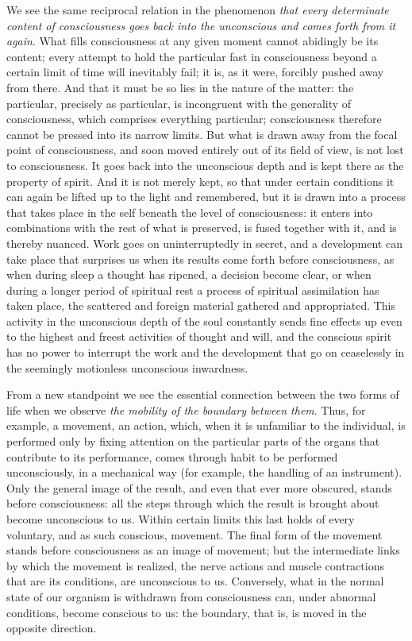 \documentclass[12pt,a4paper,openany]{book}
\newcommand{\opage}[1]{\marginnote{\footnotesize\textit{[#1]}}}
\begin{document}
\opage{48}We see the same reciprocal relation in the phenomenon
\emph{that every determinate content of consciousness goes back into
the unconscious and comes forth from it again}. What fills
consciousness at any given moment cannot abidingly be its content;
every attempt to hold the particular fast in consciousness beyond a
certain limit of time will inevitably fail; it is, as it were, forcibly
pushed away from there. And that it must be so lies in the nature of
the matter: the particular, precisely as particular, is incongruent
with the generality of consciousness, which comprises everything
particular; consciousness therefore cannot be pressed into its narrow
limits. But what is drawn away from the focal point of consciousness,
and soon moved entirely out of its field of view, is not lost to
consciousness. It goes back into the unconscious depth and is kept
there as the property of spirit. And it is not merely kept, so that
under certain conditions it can again be lifted up to the light and
remembered, but it is drawn into a process that takes place in the self
beneath the level of consciousness: it enters into combinations with the
rest of what is preserved, is fused together with it, and is thereby
nuanced. Work goes on uninterruptedly in secret, and a development can
take place that surprises us when its results come forth before
consciousness, as when during sleep a thought has ripened, a decision
become clear, or when during a longer period of spiritual rest a
process of spiritual assimilation has taken place, the scattered and
foreign material gathered and appropriated. This activity in the
unconscious depth of the soul constantly sends fine effects up even
to the highest and freest activities of thought and will, and the
conscious spirit has no power to interrupt the work and the development
that go on ceaselessly in the seemingly motionless unconscious inwardness.

From a new standpoint we see the essential connection between the two
forms of life when we observe \emph{the mobility of the boundary between
them}. Thus, for example, a movement, an action, which, when it is
unfamiliar to
\opage{49}the individual, is performed only by fixing attention on the
particular parts of the organs that contribute to its performance, comes
through habit to be performed unconsciously, in a mechanical way (for
example, the handling of an instrument). Only the general image of the
result, and even that ever more obscured, stands before consciousness:
all the steps through which the result is brought about become
unconscious to us. Within certain limits this last holds of every
voluntary, and as such conscious, movement. The final form of the
movement stands before consciousness as an image of movement; but the
intermediate links by which the movement is realized, the nerve actions
and muscle contractions that are its conditions, are unconscious to us.
Conversely, what in the normal state of our organism is withdrawn from
consciousness can, under abnormal conditions, become conscious to us:
the boundary, that is, is moved in the opposite direction.
\end{document}
